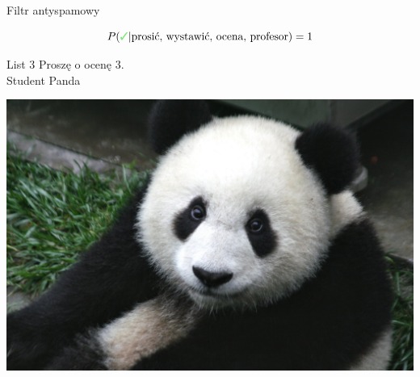 \documentclass{beamer}
\newcommand{\cmark}{\textcolor{green!80!black!50}{\text{\ding{51}}}}
\begin{document}
\begin{frame}{Filtr antyspamowy}
{\begin{minipage}{.45\textwidth}
\end{minipage}
\[ P(\cmark | \text{prosić, wystawić, ocena, profesor})=1 \]
}
{
	\begin{minipage}{.50\textwidth}
\begin{block}{List 3}
Proszę o ocenę 3.\\
Student Panda
\end{block}
\end{minipage}
\hfill
\begin{minipage}{.45\textwidth}
\includegraphics[width=\textwidth]{bayes/Panda_Cub_from_Wolong,_Sichuan,_China.JPG}\\
\end{minipage}

}
\end{frame}
\end{document}
